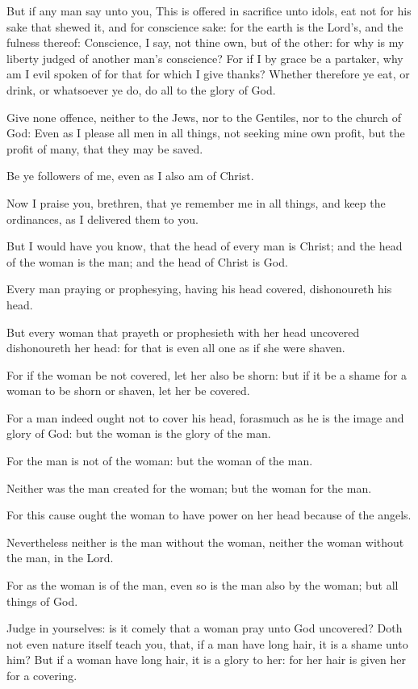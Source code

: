 \Verse But if any man say unto you, This is offered in sacrifice unto idols, eat not for his sake that shewed it, and for conscience sake: for the earth is the Lord's, and the fulness thereof: \Verse Conscience, I say, not thine own, but of the other: for why is my liberty judged of another man's conscience?  \Verse For if I by grace be a partaker, why am I evil spoken of for that for which I give thanks?  \Verse Whether therefore ye eat, or drink, or whatsoever ye do, do all to the glory of God.

\Verse Give none offence, neither to the Jews, nor to the Gentiles, nor to the church of God: \Verse Even as I please all men in all things, not seeking mine own profit, but the profit of many, that they may be saved.


\Chapter
\Verse Be ye followers of me, even as I also am of Christ.

\Verse Now I praise you, brethren, that ye remember me in all things, and keep the ordinances, as I delivered them to you.

\Verse But I would have you know, that the head of every man is Christ; and the head of the woman is the man; and the head of Christ is God.

\Verse Every man praying or prophesying, having his head covered, dishonoureth his head.

\Verse But every woman that prayeth or prophesieth with her head uncovered dishonoureth her head: for that is even all one as if she were shaven.

\Verse For if the woman be not covered, let her also be shorn: but if it be a shame for a woman to be shorn or shaven, let her be covered.

\Verse For a man indeed ought not to cover his head, forasmuch as he is the image and glory of God: but the woman is the glory of the man.

\Verse For the man is not of the woman: but the woman of the man.

\Verse Neither was the man created for the woman; but the woman for the man.

\Verse For this cause ought the woman to have power on her head because of the angels.

\Verse Nevertheless neither is the man without the woman, neither the woman without the man, in the Lord.

\Verse For as the woman is of the man, even so is the man also by the woman; but all things of God.

\Verse Judge in yourselves: is it comely that a woman pray unto God uncovered?  \Verse Doth not even nature itself teach you, that, if a man have long hair, it is a shame unto him?  \Verse But if a woman have long hair, it is a glory to her: for her hair is given her for a covering.

